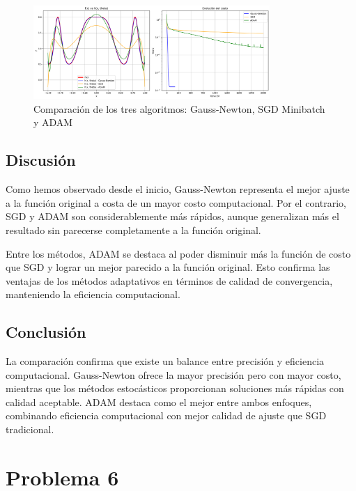 \documentclass{article}
\begin{document}
\begin{figure}[H]
    \centering
    \includegraphics[width=0.8\textwidth]{images/5_comparation_algorithms.png}
    \caption{Comparación de los tres algoritmos: Gauss-Newton, SGD Minibatch y ADAM}
    \label{fig:comparison_algorithms}
\end{figure}

\subsection{Discusión}

Como hemos observado desde el inicio, Gauss-Newton representa el mejor ajuste a la función original a costa de un mayor costo computacional. Por el contrario, SGD y ADAM son considerablemente más rápidos, aunque generalizan más el resultado sin parecerse completamente a la función original.

Entre los métodos, ADAM se destaca al poder disminuir más la función de costo que SGD y lograr un mejor parecido a la función original. Esto confirma las ventajas de los métodos adaptativos en términos de calidad de convergencia, manteniendo la eficiencia computacional.

\subsection{Conclusión}

La comparación confirma que existe un balance entre precisión y eficiencia computacional. Gauss-Newton ofrece la mayor precisión pero con mayor costo, mientras que los métodos estocásticos proporcionan soluciones más rápidas con calidad aceptable. ADAM destaca como el mejor entre ambos enfoques, combinando eficiencia computacional con mejor calidad de ajuste que SGD tradicional.


\section{Problema 6}
\end{document}
